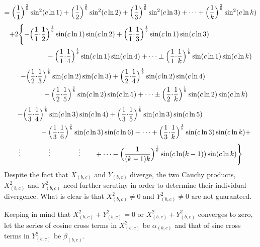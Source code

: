 \documentclass{amsart}
\begin{document}
	\[ = \Bigl( \frac{1}{1} \Bigr)^{\frac2b}\sin^2({c \ln 1}) + \Bigl( \frac{1}{2} \Bigr)^{\frac2b}\sin^2({c \ln 2}) + \Bigl( \frac{1}{3} \Bigr)^{\frac2b}\sin^2({c \ln 3}) + \dots + \Bigl( \frac{1}{k} \Bigr)^{\frac2b}\sin^2({c \ln k}) \]
	\[
	\begin{aligned}
		+2\Biggl\{ -\Bigl( \frac{1}{1} {\cdot} \frac{1}{2}& \Bigr)^\frac1b \sin(c \ln1) \sin(c \ln2) + \Bigl( \frac{1}{1} {\cdot} \frac{1}{3} \Bigr)^\frac1b \sin(c \ln 1) \sin(c \ln 3) \\ 
		& - \Bigl( \frac{1}{1} {\cdot} \frac{1}{4} \Bigr)^\frac1b \sin(c \ln 1) \sin(c \ln 4) + \dots \pm \Bigl( \frac{1}{1} {\cdot} \frac{1}{k} \Bigr)^\frac1b \sin(c \ln 1) \sin(c \ln k) \\ 		
	\end{aligned}
	\]
	\[
	\begin{aligned}
		\quad - \Bigl( \frac{1}{2} {\cdot} \frac{1}{3}& \Bigr)^\frac1b \sin(c \ln2) \sin(c \ln3) + \Bigl( \frac{1}{2} {\cdot} \frac{1}{4} \Bigr)^\frac1b \sin(c \ln 2) \sin(c \ln 4) \\ 
		& - \Bigl( \frac{1}{2} {\cdot} \frac{1}{5} \Bigr)^\frac1b \sin(c \ln 2) \sin(c \ln 5) + \dots \pm \Bigl( \frac{1}{2} {\cdot} \frac{1}{k} \Bigr)^\frac1b \sin(c \ln 2) \sin(c \ln k) \\ 		
	\end{aligned}
	\]
	\[
	\begin{aligned}
		\quad - \Bigl( \frac{1}{3} {\cdot} \frac{1}{4}& \Bigr)^\frac1b \sin(c \ln3) \sin(c \ln4) + \Bigl( \frac{1}{3} {\cdot} \frac{1}{5} \Bigr)^\frac1b \sin(c \ln 3) \sin(c \ln 5) \\ 
		& - \Bigl( \frac{1}{3} {\cdot} \frac{1}{6} \Bigr)^\frac1b \sin(c \ln 3) \sin(c \ln 6) + \dots + \Bigl( \frac{1}{3} {\cdot} \frac{1}{k} \Bigr)^\frac1b \sin(c \ln 3) \sin(c \ln k) + \\ 		
	\end{aligned}
	\]
	\[
	\begin{aligned}
		\vdots \qquad\qquad \vdots \qquad\qquad \vdots \qquad + \dots - \Bigl( \frac{1}{(k-1)k} \Bigr)^\frac1b \sin(c \ln (k-1)) \sin(c \ln k) \Biggr\}
	\end{aligned}
	\]
	Despite the fact that $X_{(b,c)}$ and $Y_{(b,c)}$ diverge, the two Cauchy products, $X_{(b,c)}^2$ and $Y_{(b,c)}^2$ need further scrutiny in order to determine their individual divergence. What is clear is that $X_{(b,c)}^2 \neq 0$ and $Y_{(b,c)}^2 \neq 0$ are not guaranteed.
	\[\]
	
	Keeping in mind that $X_{(b,c)}^2 + Y_{(b,c)}^2 = 0$ or $X_{(b,c)}^2 + Y_{(b,c)}^2$ converges to zero, let the series of cosine cross terms in $X_{(b,c)}^2$ be $\alpha_{(b,c)}$ and that of sine cross terms in $Y_{(b,c)}^2$ be $\beta_{(b,c)}$.
	
\end{document}
